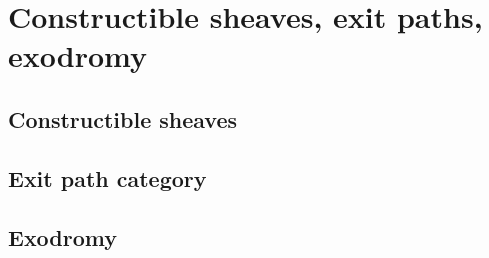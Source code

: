 \chapter{Constructible sheaves, exit paths, exodromy}

\section{Constructible sheaves}

\section{Exit path category}

\section{Exodromy}

